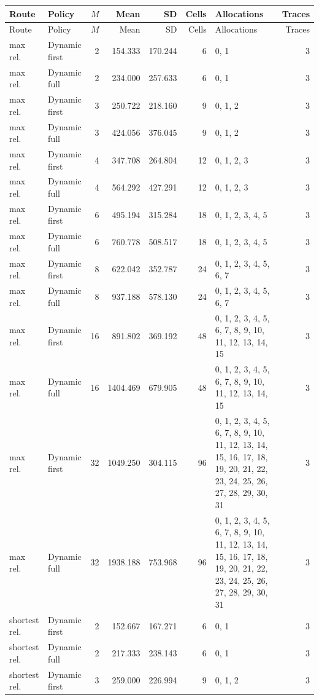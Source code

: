 \documentclass[10pt,a4paper]{article}
\begin{document}
\tiny\setlength{\tabcolsep}{2pt}\begin{longtable}{@{}p{23mm}p{29mm}rrrrp{36mm}r@{}}
\toprule Route & Policy & $M$ & Mean & SD & Cells & Allocations & Traces \\ \midrule\endfirsthead
\toprule Route & Policy & $M$ & Mean & SD & Cells & Allocations & Traces \\ \midrule\endhead
\bottomrule\endfoot
max rel. & Dynamic first & 2 & 154.333 & 170.244 & 6 & 0, 1 & 3 \\
max rel. & Dynamic full & 2 & 234.000 & 257.633 & 6 & 0, 1 & 3 \\
max rel. & Dynamic first & 3 & 250.722 & 218.160 & 9 & 0, 1, 2 & 3 \\
max rel. & Dynamic full & 3 & 424.056 & 376.045 & 9 & 0, 1, 2 & 3 \\
max rel. & Dynamic first & 4 & 347.708 & 264.804 & 12 & 0, 1, 2, 3 & 3 \\
max rel. & Dynamic full & 4 & 564.292 & 427.291 & 12 & 0, 1, 2, 3 & 3 \\
max rel. & Dynamic first & 6 & 495.194 & 315.284 & 18 & 0, 1, 2, 3, 4, 5 & 3 \\
max rel. & Dynamic full & 6 & 760.778 & 508.517 & 18 & 0, 1, 2, 3, 4, 5 & 3 \\
max rel. & Dynamic first & 8 & 622.042 & 352.787 & 24 & 0, 1, 2, 3, 4, 5, 6, 7 & 3 \\
max rel. & Dynamic full & 8 & 937.188 & 578.130 & 24 & 0, 1, 2, 3, 4, 5, 6, 7 & 3 \\
max rel. & Dynamic first & 16 & 891.802 & 369.192 & 48 & 0, 1, 2, 3, 4, 5, 6, 7, 8, 9, 10, 11, 12, 13, 14, 15 & 3 \\
max rel. & Dynamic full & 16 & 1404.469 & 679.905 & 48 & 0, 1, 2, 3, 4, 5, 6, 7, 8, 9, 10, 11, 12, 13, 14, 15 & 3 \\
max rel. & Dynamic first & 32 & 1049.250 & 304.115 & 96 & 0, 1, 2, 3, 4, 5, 6, 7, 8, 9, 10, 11, 12, 13, 14, 15, 16, 17, 18, 19, 20, 21, 22, 23, 24, 25, 26, 27, 28, 29, 30, 31 & 3 \\
max rel. & Dynamic full & 32 & 1938.188 & 753.968 & 96 & 0, 1, 2, 3, 4, 5, 6, 7, 8, 9, 10, 11, 12, 13, 14, 15, 16, 17, 18, 19, 20, 21, 22, 23, 24, 25, 26, 27, 28, 29, 30, 31 & 3 \\
shortest rel. & Dynamic first & 2 & 152.667 & 167.271 & 6 & 0, 1 & 3 \\
shortest rel. & Dynamic full & 2 & 217.333 & 238.143 & 6 & 0, 1 & 3 \\
shortest rel. & Dynamic first & 3 & 259.000 & 226.994 & 9 & 0, 1, 2 & 3 \\

\end{longtable}
\end{document}
